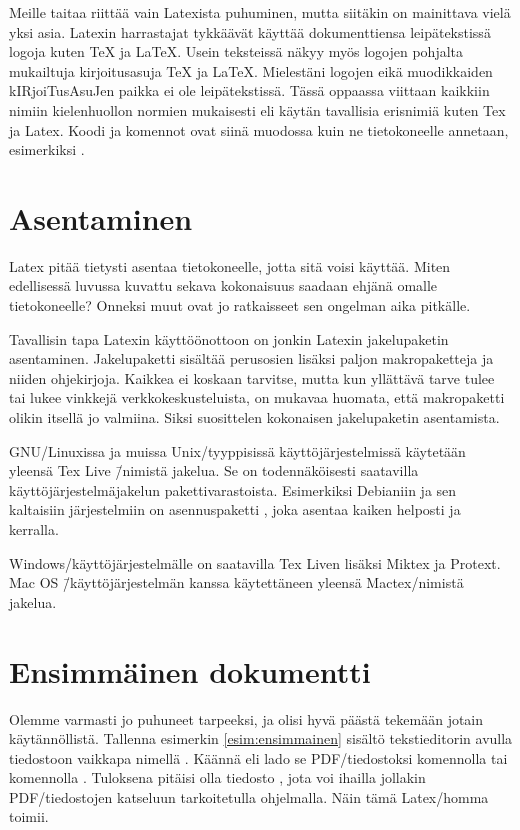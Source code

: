 Meille taitaa riittää vain Latexista puhuminen, mutta siitäkin on
mainittava vielä yksi asia. Latexin harrastajat tykkäävät käyttää
dokumenttiensa leipätekstissä logoja kuten \TeX{} ja \LaTeX{}. Usein
teksteissä näkyy myös logojen pohjalta mukailtuja kirjoitus\-asuja TeX
ja LaTeX. Mielestäni logojen eikä muodikkaiden kIRjoiTus\-AsuJen paikka
ei ole leipätekstissä. Tässä oppaassa viittaan kaikkiin nimiin
kielenhuollon normien mukaisesti eli käytän tavallisia erisnimiä kuten
Tex ja Latex. Koodi ja komennot ovat siinä muodossa kuin ne
tietokoneelle annetaan, esimerkiksi .

\section{Asentaminen}
\label{luku:asentaminen}

Latex pitää tietysti asentaa tietokoneelle, jotta sitä voisi käyttää.
Miten edellisessä luvussa kuvattu sekava kokonaisuus saadaan ehjänä
omalle tietokoneelle? Onneksi muut ovat jo ratkaisseet sen ongelman aika
pitkälle.

Tavallisin tapa Latexin käyttöön\-ottoon on jonkin Latexin jakelupaketin
asentaminen. Jakelupaketti sisältää perus\-osien lisäksi paljon
makropaketteja ja niiden ohjekirjoja. Kaikkea ei koskaan tarvitse, mutta
kun yllättävä tarve tulee tai lukee vinkkejä verkkokeskusteluista, on
mukavaa huomata, että makropaketti olikin itsellä jo valmiina. Siksi
suosittelen kokonaisen jakelupaketin asentamista.

GNU/Linuxissa ja muissa Unix\-/tyyppisissä käyttöjärjestelmissä
käytetään yleensä Tex Live \=/nimistä jakelua. Se on todennäköisesti
saatavilla käyttöjärjestelmäjakelun pakettivarastoista. Esimerkiksi
Debianiin ja sen kaltaisiin järjestelmiin on asennuspaketti
, joka asentaa kaiken helposti ja kerralla.

Windows\-/käyttöjärjestelmälle on saatavilla Tex Liven lisäksi Miktex ja
Protext. Mac OS \=/käyttöjärjestelmän kanssa käytettäneen yleensä
Mactex\-/nimistä jakelua.

\section{Ensimmäinen dokumentti}

Olemme varmasti jo puhuneet tarpeeksi, ja olisi hyvä päästä tekemään
jotain käytännöllistä. Tallenna esimerkin \ref{esim:ensimmainen} sisältö
teksti\-editorin avulla tiedostoon vaikkapa nimellä .
Käännä eli lado se PDF\-/tiedostoksi komennolla  tai komennolla . Tuloksena
pitäisi olla tiedosto , jota voi ihailla jollakin
PDF\-/tiedostojen katseluun tarkoitetulla ohjelmalla. Näin tämä
Latex\-/homma toimii.

